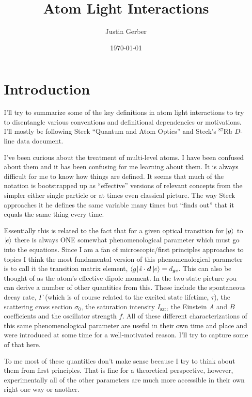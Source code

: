 \documentclass[12pt]{article}
\newcommand{\bv}[1]{\boldsymbol{#1}}
\begin{document}
\title{Atom Light Interactions}
\author{Justin Gerber}
\date{\today}
\maketitle

\section{Introduction}

I'll try to summarize some of the key definitions in atom light interactions to try to disentangle various conventions and definitional dependencies or motivations. I'll mostly be following Steck ``Quantum and Atom Optics'' and Steck's $^{87}\text{Rb}$ $D$-line data document.

I've been curious about the treatment of multi-level atoms. I have been confused about them and it has been confusing for me learning about them. It is always difficult for me to know how things are defined. It seems that much of the notation is bootstrapped up as ``effective'' versions of relevant concepts from the simpler either single particle or at times even classical picture. The way Steck approaches it he defines the same variable many times but ``finds out'' that it equals the same thing every time. 

Essentially this is related to the fact that for a given optical transition for $\ket{g}$ to $\ket{e}$ there is always ONE somewhat phenomenological parameter which must go into the equations. Since I am a fan of microscopic/first principles approaches to topics I think the most fundamental version of this phenomenological parameter is to call it the transition matrix element, $\bra{g} \hat{\epsilon}\cdot \bv{d} \ket{e} = d_{ge}$. This can also be thought of as the atom's effective dipole moment. In the two-state picture you can derive a number of other quantities from this. These include the spontaneous decay rate, $\Gamma$ (which is of course related to the excited state lifetime, $\tau$), the scattering cross section $\sigma_0$, the saturation intensity $I_{\text{sat}}$, the Einstein $A$ and $B$ coefficients and the oscillator strength $f$. All of these different characterizations of this same phenomenological parameter are useful in their own time and place and were introduced at some time for a well-motivated reason. I'll try to capture some of that here.

To me most of these quantities don't make sense because I try to think about them from first principles. That is fine for a theoretical perspective, however, experimentally all of the other parameters are much more accessible in their own right one way or another.
\end{document}
